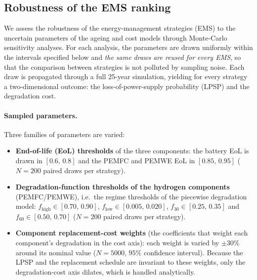 
\subsection{Robustness of the EMS ranking}
\label{sec:sensitivity}

We assess the robustness of the energy-management strategies (EMS) to the
uncertain parameters of the ageing and cost models through Monte-Carlo
sensitivity analyses. For each analysis, the parameters are drawn uniformly
within the intervals specified below and \emph{the same draws are reused for
every EMS}, so that the comparison between strategies is not polluted by sampling
noise. Each draw is propagated through a full 25-year simulation, yielding for
every strategy a two-dimensional outcome: the loss-of-power-supply probability
(LPSP) and the degradation cost.

\paragraph{Sampled parameters.}
Three families of parameters are varied:
\begin{itemize}
  \item \textbf{End-of-life (EoL) thresholds} of the three components: the
        battery EoL is drawn in $[0.6,\,0.8]$ and the PEMFC and PEMWE EoL in
        $[0.85,\,0.95]$ ($N=200$ paired draws per strategy).
  \item \textbf{Degradation-function thresholds of the hydrogen components}
        (PEMFC/PEMWE), i.e.\ the regime thresholds of the piecewise degradation
        model: $f_\mathrm{high}\in[0.70,\,0.90]$, $f_\mathrm{low}\in[0.005,\,0.020]$,
        $f_{30}\in[0.25,\,0.35]$ and $f_{60}\in[0.50,\,0.70]$ ($N=200$ paired
        draws per strategy).
  \item \textbf{Component replacement-cost weights} (the coefficients that weight
        each component's degradation in the cost axis): each weight is varied by
        $\pm30\%$ around its nominal value ($N=5000$, $95\%$ confidence interval).
        Because the LPSP and the replacement schedule are invariant to these
        weights, only the degradation-cost axis dilates, which is handled
        analytically.
\end{itemize}

